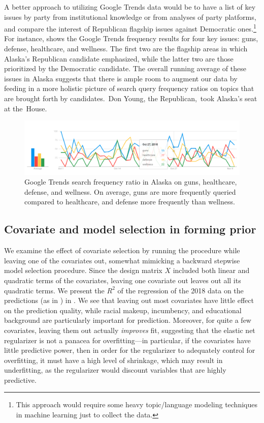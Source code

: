 \documentclass[12pt]{article}
\begin{document}
A better approach to utilizing Google Trends data would be to have a list of key issues by party from institutional knowledge or from analyses of party platforms, and compare the interest of Republican flagship issues against Democratic ones.\footnote{This approach would require some heavy topic/language modeling techniques in machine learning just to collect the data.} For instance,  shows the Google Trends frequency results for four key issues: guns, defense, healthcare, and wellness. The first two are the flagship areas in which Alaska's Republican candidate emphasized, while the latter two are those prioritized by the Democratic candidate. The overall running average of these issues in Alaska suggests that there is ample room to augment our data by feeding in a more holistic picture of search query frequency ratios on topics that are brought forth by candidates.~Don Young, the Republican,~took Alaska's seat at the~House.

\begin{figure}[tb]
  \centering
  \includegraphics[scale=0.4]{trends_issues}
  \caption{Google Trends search frequency ratio in Alaska on guns, healthcare, defense, and wellness. On average, guns are more frequently queried compared to healthcare, and defense more frequently than wellness.}
  \label{fig:trends_issues}
\end{figure}

\subsection{Covariate and model selection in forming prior}

We examine the effect of covariate selection by running the procedure while
leaving one of the covariates out, somewhat mimicking a backward stepwise model
selection procedure. Since the design matrix $X$ included both linear and
quadratic terms of the covariates, leaving one covariate out leaves out all its
quadratic terms. We present the $R^2$ of the regression of the 2018 data on the
predictions (as in ) in . We see that
leaving out most covariates have little effect on the prediction quality, while
racial makeup, incumbency, and educational background are particularly important
for prediction. Moreover, for quite a few covariates, leaving them out actually
\emph{improves} fit, suggesting that the elastic net regularizer is not a
panacea for overfitting---in particular, if the covariates have little
predictive power, then in order for the regularizer to adequately control for
overfitting, it must have a high level of shrinkage, which may result in
underfitting, as the regularizer would discount variables that are highly
predictive.
\end{document}
